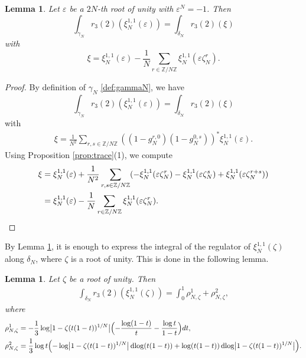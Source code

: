 \documentclass[11pt,a4,leqno]{amsart}
\theoremstyle{my theoremstyle}
\newtheorem{lem}[thm]{Lemma}
\theoremstyle{dfn}
\theoremstyle{remark}
\renewcommand{\1}{\mathbbm{1}}
\newcommand{\Z}{\mathbb{Z}}
\newcommand{\z}{\zeta}
\numberwithin{equation}{section}
\newcommand{\dlog}{\operatorname{dlog}}
\begin{document}
\begin{lem} \label{lem:reg_xi1}
Let $\varepsilon$ be a $2N$-th root of unity with $\varepsilon^N = -1$. Then
\begin{equation*}
    \int_{\gamma_N} r_3(2)(\xi_N^{1,1}(\varepsilon)) = \int_{\delta_N} r_3(2)(\xi)
\end{equation*}
with
\begin{equation*}
    \xi = \xi_N^{1,1}(\varepsilon) - \frac{1}{N} \sum_{r \in \Z/N\Z} \xi_N^{1,1}(\varepsilon \zeta_N^r).
\end{equation*}
\end{lem}

\begin{proof}
    By definition of $\gamma_N$ \eqref{def:gammaN}, we have
    \begin{equation*}
        \int_{\gamma_N} r_3(2)(\xi_N^{1,1}(\varepsilon)) = \int_{\delta_N} r_3(2)(\xi)
    \end{equation*}
    with
    \begin{align*}
        \xi = \frac{1}{N^2} \sum_{r,s \in \Z/N\Z} ((1-g_N^{r,0})(1-g_N^{0,s}))^* \xi_N^{1,1}(\varepsilon).
    \end{align*}
    Using Proposition \ref{prop:trace}(1), we compute
    \begin{align*}
        \xi & = \xi_N^{1,1}(\varepsilon) + \frac{1}{N^2} \sum_{r,s \in \Z/N\Z} (-\xi_N^{1,1}(\varepsilon \zeta_N^r) - \xi_N^{1,1}(\varepsilon \zeta_N^s) + \xi_N^{1,1}(\varepsilon \zeta_N^{r+s})) \\
        & = \xi_N^{1,1}(\varepsilon) - \frac{1}{N} \sum_{r \in \Z/N\Z} \xi_N^{1,1}(\varepsilon \zeta_N^r). \qedhere
    \end{align*}
\end{proof}

By Lemma \ref{lem:reg_xi1}, it is enough to express the integral of the regulator of $\xi_N^{1,1}(\zeta)$ along $\delta_N$, where $\zeta$ is a root of unity. This is done in the following lemma.

\begin{lem} \label{lem:reg_xi2}
    Let $\zeta$ be a root of unity. Then
    \begin{align*}
        \int_{\delta_N} r_3(2)(\xi_N^{1,1}(\zeta)) = \int_0^1 \rho_{N,\z}^1 + \rho_{N,\z}^2,
    \end{align*}
    where
    \begin{align*}
        \rho_{N,\z}^1 & = - \frac13 \log \bigl|1-\zeta (t(1-t))^{1/N}\bigr| \Bigl(-\frac{\log(1-t)}{t} - \frac{\log t}{1-t}\Bigr) dt, \\
        \rho_{N,\z}^2 & = \frac13 \log t \Bigl(-\log \bigl|1-\zeta (t(1-t))^{1/N}\bigr| \dlog(t(1-t)) + \log(t(1-t)) \dlog \bigl|1-\zeta (t(1-t))^{1/N}\bigr| \Bigr).
    \end{align*}
\end{lem}
\end{document}
